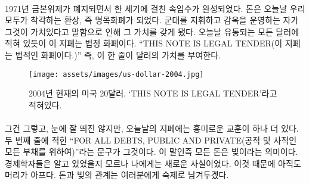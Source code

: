 \paragraph{}
\begin{comment}
	With the abolishment of the gold standard in 1971, this century-long
	sleight-of-hand was complete. Money became the illusion we all share to
	this day: fiat money. It is worth something because someone commanding
	an army and operating jails says it is wort능h something. As can be
	clearly read on every dollar note in circulation today, \enquote{THIS NOTE IS
		LEGAL TENDER}. In other words: It is valuable because the note says so.
\end{comment}
1971년 금본위제가 폐지되면서 한 세기에 걸친 속임수가 완성되었다. 
돈은 오늘날 우리 모두가 착각하는 환상, 즉 명목화폐가 되었다. 
군대를 지휘하고 감옥을 운영하는 자가 그것이 가치있다고 말함으로 인해 그 가치를 갖게 됐다. 
오늘날 유통되는 모든 달러에 적혀 있듯이 이 지폐는 법정 화폐이다. 
\enquote{THIS NOTE IS LEGAL TENDER(이 지폐는 법적인 화폐이다.)}
즉, 이 한 줄이 달러의 가치를 부여한다.

\begin{comment}
	\begin{figure}
		\centering
		\texttt{[image: assets/images/us-dollar-2004.jpg]}
		\caption{A 2004 series U.S. twenty dollar note used today. `THIS NOTE IS LEGAL TENDER'}
		\label{fig:us-dollar-2004}
	\end{figure}
\end{comment}
\begin{figure}
	\centering
	\texttt{[image: assets/images/us-dollar-2004.jpg]}
	\caption{2004년 현재의 미국 20달러. `THIS NOTE IS LEGAL TENDER'라고 적혀있다.}
	\label{fig:us-dollar-2004}
\end{figure}

\paragraph{}
\begin{comment}
	By the way, there is another interesting lesson on today's bank notes,
	hidden in plain sight. The second line reads that this is legal tender
	\enquote{FOR ALL DEBTS, PUBLIC AND PRIVATE}. What might be obvious to economists
	was surprising to me: All money is debt. My head is still hurting
	because of it, and I will leave the exploration of the relation of money
	and debt as an exercise to the reader.
\end{comment}
그건 그렇고, 눈에 잘 띄진 않지만, 오늘날의 지폐에는 흥미로운 교훈이 하나 더 있다. 
두 번째 줄에 적힌 \enquote{FOR ALL DEBTS, PUBLIC AND PRIVATE(공적 및 사적인 모든 부채를 위하여)}라는 문구가 그것이다. 
이 말인즉 모든 돈은 빚이라는 의미이다. 경제학자들은 알고 있었을지 모르나 나에게는 새로운 사실이었다. 
이것 때문에 아직도 머리가 아프다. 돈과 빚의 관계는 여러분에게 숙제로 남겨두겠다.

